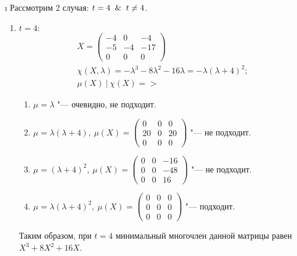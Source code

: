 \i
Рассмотрим 2 случая: $t = 4 \And t \ne 4$.
\begin{enumerate}
    \item $t = 4:$
        \begin{gather*}
            X = \begin{pmatrix}
                -4 & 0 & -4\\
                -5 & -4 & -17\\
                0 & 0 & 0
            \end{pmatrix}\\
            \chi(X, \lambda) = -\lambda^3 -8\lambda^2 - 16\lambda = -\lambda(\lambda + 4)^2;\\
            \mu(X) \  | \ \chi(X) => \end{gather*} 
            \begin{enumerate}
                \item $\mu = \lambda$ "--- очевидно, не подходит.
                \item $\mu = \lambda(\lambda + 4), \ \mu(X) = \begin{pmatrix}
                    0 & 0 & 0\\
                    20 & 0 & 20\\
                    0 & 0 & 0
                \end{pmatrix}$ "--- не подходит.
                \item $\mu = (\lambda + 4)^2, \ \mu(X) = \begin{pmatrix}
                    0 & 0 & -16\\
                    0 & 0 & -48\\
                    0 & 0 & 16
                \end{pmatrix}$ "--- не подходит.
                \item $\mu = \lambda(\lambda + 4)^2, \ \mu(X) = \begin{pmatrix}
                    0 & 0 & 0\\
                    0 & 0 & 0\\
                    0 & 0 & 0
                \end{pmatrix}$ "--- подходит.
            \end{enumerate}
            Таким образом, при $t = 4$ минимальный многочлен данной матрицы равен $X^3 + 8X^2 + 16X$.
    

\end{enumerate}
